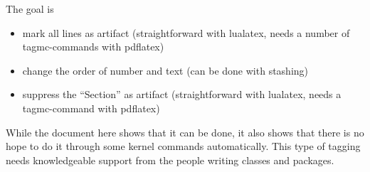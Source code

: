 \documentclass[12pt]{article}
\begin{document}
The goal is
\begin{itemize}
\item mark all lines as artifact (straightforward with lualatex, needs a number of tagmc-commands with pdflatex)
\item change the order of number and text (can be done with stashing)
\item suppress the \enquote{Section} as artifact (straightforward with lualatex, needs a tagmc-command with pdflatex)
\end{itemize}

While the document here shows that it can be done, it also shows that there is no hope
to do it through some kernel commands automatically. This type of tagging needs knowledgeable support from the people writing classes and packages.
\tagmcend%

\tagstructend
\end{document}
